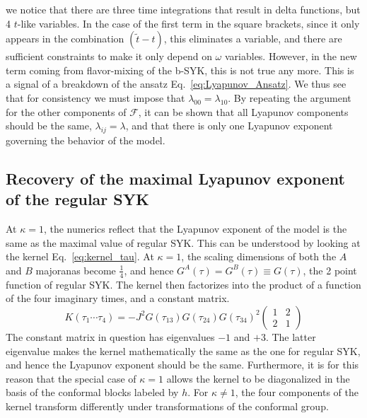 we notice that there are three time integrations that result in delta functions,
but 4 $t$-like variables. In the case of the first term in the square brackets,
since it only appears in the combination $(\tilde{t} - t)$, this eliminates a variable,
and there are sufficient constraints to make it only depend on $\omega$ variables. However,
in the new term coming from flavor-mixing of the b-SYK, this is not true any more.
This is a signal of a breakdown of the ansatz Eq.~\eqref{eq:Lyapunov_Ansatz}.
We thus see that for consistency we must impose that $\lambda_{00} = \lambda_{10}$.
By repeating the argument for the other components of $\mathcal{F}$,
it can be shown that all Lyapunov components should be the same, $\lambda_{ij} = \lambda$,
and that there is only one Lyapunov exponent governing the behavior of the model.

\subsection{Recovery of the maximal Lyapunov exponent of the regular SYK}
At $\kappa=1$, the numerics reflect that the Lyapunov exponent of the model is the same as the maximal value of regular SYK. This can be understood by looking at the kernel Eq.~\eqref{eq:kernel_tau}. At $\kappa=1$, the scaling dimensions of both the $A$ and $B$ majoranas become $\frac{1}{4}$, and hence $G^A(\tau) = G^B(\tau) \equiv G(\tau)$, the 2 point function of regular SYK. The kernel then factorizes into the product of a function of the four imaginary times, and a constant matrix. 
\begin{equation}
	K(\tau_1\cdots\tau_4) = -J^2 G(\tau_{13})G(\tau_{24})G(\tau_{34})^2 \begin{pmatrix}
		1 & 2 \\
		2 & 1
	\end{pmatrix}
\end{equation}
The constant matrix in question has eigenvalues $-1$ and $+3$. The latter eigenvalue makes the kernel mathematically the same as the one for regular SYK, and hence the Lyapunov exponent should be the same.  Furthermore, it is for this reason that the special case of $\kappa=1$ allows the kernel to be diagonalized in the basis of the conformal blocks labeled by $h$. For $\kappa \neq 1$, the four components of the kernel transform differently under transformations of the conformal group. 



